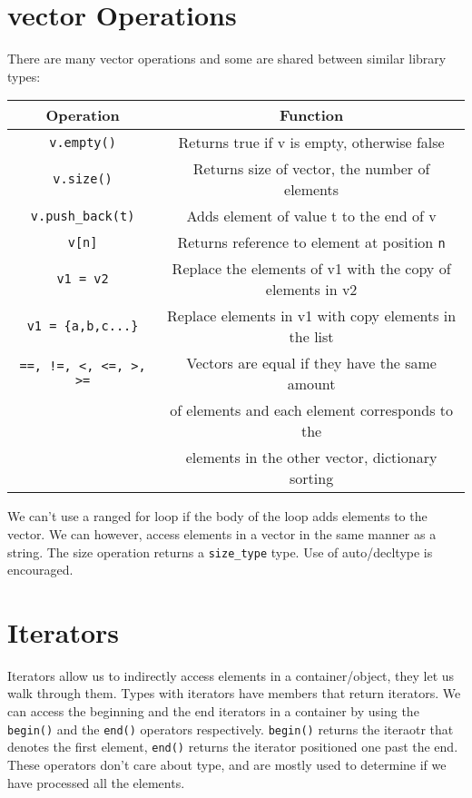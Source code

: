 \documentclass[12pt, a4paper]{report}
\begin{document}
\section{vector Operations}
There are many vector operations and some are shared between similar library types:
\begin{center}
  \begin{tabular}{ |c|c| }
    \hline
    \textbf{Operation} & \textbf{Function} \\
    \hline
    \verb|v.empty()| & Returns true if v is empty, otherwise false \\
    \hline
    \verb|v.size()| & Returns size of vector, the number of elements \\
    \hline
    \verb|v.push_back(t)| & Adds element of value t to the end of v \\
    \hline
    \verb|v[n]| & Returns reference to element at position \verb|n| \\
    \hline
    \verb|v1 = v2| & Replace the elements of v1 with the copy of elements in v2 \\
    \hline
    \verb|v1 = {a,b,c...}| & Replace elements in v1 with copy elements in the list \\
    \hline
    \verb|==, !=, <, <=, >, >=| & Vectors are equal if they have the same amount \\
                                & of elements and each element corresponds to the \\
                                & elements in the other vector, dictionary sorting \\
                                \hline
  \end{tabular}
\end{center}
We can't use a ranged for loop if the body of the loop adds elements to the vector. We can however, access elements in a vector in the same manner as a string.
The size operation returns a \verb|size_type| type. Use of auto/decltype is encouraged.
\section{Iterators}
Iterators allow us to indirectly access elements in a container/object, they let us walk through them. Types with iterators have members that return iterators.
We can access the beginning and the end iterators in a container by using the \verb|begin()| and the \verb|end()| operators respectively. 
\verb|begin()| returns the iteraotr that denotes the first element, \verb|end()| returns the iterator positioned one past the end.
These operators don't care about type, and are mostly used to determine if we have processed all the elements.
\end{document}
